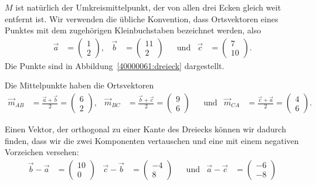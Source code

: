 \begin{loesung}
$M$ ist natürlich der Umkreismittelpunkt, der von allen drei Ecken gleich
weit entfernt ist.
Wir verwenden die übliche Konvention, dass Ortsvektoren eines Punktes
mit dem zugehörigen Kleinbuchstaben bezeichnet werden, also
\[
\begin{aligned}
\vec{a}&=\begin{pmatrix} 1\\ 2\end{pmatrix},&
\vec{b}&=\begin{pmatrix}11\\ 2\end{pmatrix}&
&\text{und}&
\vec{c}&=\begin{pmatrix} 7\\10\end{pmatrix}.
\end{aligned}
\]
Die Punkte sind in Abbildung~\ref{40000061:dreieck} dargestellt.
\begin{teilaufgaben}
%
%
\item Die Mittelpunkte haben die Ortsvektoren
\[
\begin{aligned}
\vec{m}_{AB}&=\frac{\vec{a}+\vec{b}}2=\begin{pmatrix}6\\2\end{pmatrix},
&
\vec{m}_{BC}&=\frac{\vec{b}+\vec{c}}2=\begin{pmatrix}9\\6\end{pmatrix}
&
&\text{und}&
\vec{m}_{CA}&=\frac{\vec{c}+\vec{a}}2=\begin{pmatrix}4\\6\end{pmatrix}.
\end{aligned}
\]
%
%
\item Einen Vektor, der orthogonal zu einer Kante des Dreiecks können
wir dadurch finden, dass wir die zwei Komponenten vertauschen und eine
mit einem negativen Vorzeichen versehen:
\[
\begin{aligned}
\vec{b}-\vec{a}&=\begin{pmatrix}10\\ 0\end{pmatrix}&
\vec{c}-\vec{b}&=\begin{pmatrix}-4\\ 8\end{pmatrix}&
&\text{und}&
\vec{a}-\vec{c}&=\begin{pmatrix}-6\\-8\end{pmatrix}

\end{aligned}\]
\end{teilaufgaben}
\end{loesung}
